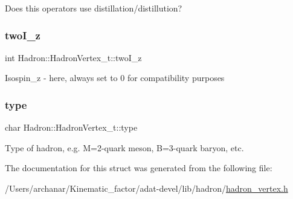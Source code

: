 Does this operators use distillation/distillution? \mbox{\label{structHadron_1_1HadronVertex__t_a3edfa542bdf8bd3928a454622bb99157}} 
\subsubsection{\texorpdfstring{twoI\_z}{twoI\_z}}
{\footnotesize\ttfamily int Hadron\+::\+Hadron\+Vertex\+\_\+t\+::two\+I\+\_\+z}

Isospin\+\_\+z -\/ here, always set to 0 for compatibility purposes \mbox{\label{structHadron_1_1HadronVertex__t_afc823aabf51c8e23cd8ca57714743f0a}} 
\subsubsection{\texorpdfstring{type}{type}}
{\footnotesize\ttfamily char Hadron\+::\+Hadron\+Vertex\+\_\+t\+::type}

Type of hadron, e.\+g. M=2-\/quark meson, B=3-\/quark baryon, etc. 

The documentation for this struct was generated from the following file\+:\begin{DoxyCompactItemize}
\item 
/\+Users/archanar/\+Kinematic\+\_\+factor/adat-\/devel/lib/hadron/\mbox{\hyperlink{adat-devel_2lib_2hadron_2hadron__vertex_8h}{hadron\+\_\+vertex.\+h}}\end{DoxyCompactItemize}

